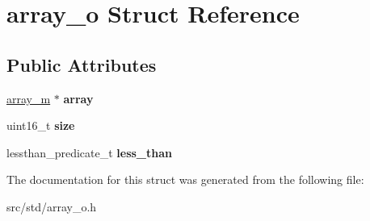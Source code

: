 \hypertarget{structarray__o}{}\section{array\+\_\+o Struct Reference}
\label{structarray__o}
\subsection*{Public Attributes}
\begin{DoxyCompactItemize}
\item 
\mbox{\label{structarray__o_aa34f658bc77a9867a906aa89629943a0}} 
\hyperlink{structarray__m}{array\+\_\+m} $\ast$ {\bfseries array}
\item 
\mbox{\label{structarray__o_a294c09418a8155c12526d01604577923}} 
uint16\+\_\+t {\bfseries size}
\item 
\mbox{\label{structarray__o_abf04272c30f2ca8af6331a382f75387d}} 
lessthan\+\_\+predicate\+\_\+t {\bfseries less\+\_\+than}
\end{DoxyCompactItemize}


The documentation for this struct was generated from the following file\+:\begin{DoxyCompactItemize}
\item 
src/std/array\+\_\+o.\+h\end{DoxyCompactItemize}
